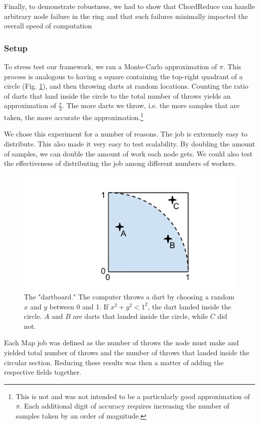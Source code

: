 Finally, to demonstrate robustness, we had to show that ChordReduce can handle arbitrary node failure in the ring and that such failures minimally impacted the overall speed of computation

\subsubsection{Setup}


To stress test our framework, we ran a Monte-Carlo approximation of $\pi$. 
This process is analogous to having a square containing  the top-right quadrant of a circle (Fig. \ref{fig:dartboard}), and then throwing darts at random locations.  
Counting the ratio of darts that land inside the circle to the total number of throws yields an approximation of $\frac{\pi}{4}$.  
The more darts we throw, i.e. the more samples that are taken, the more accurate the approximation.\footnote{This is not and was not intended to be a particularly good approximation of $\pi$.
Each additional digit of accuracy requires increasing the number of samples taken by an order of magnitude.}


We chose this experiment for a number of reasons. 
The job is extremely easy to distribute.  
This also made it very easy to test scalability. 
By doubling the amount of samples, we can double the amount of work each node gets.  
We could also test the effectiveness of distributing the job among different numbers of workers.


\begin{figure}
	\centering
	\includegraphics[width=0.5\linewidth]{figs/dartboard}
	\caption{The "dartboard." The computer throws a dart by choosing a random $x$ and $y$ between 0 and 1.  If $x^{2} + y^{2} < 1^{2} $, the dart landed inside the circle.  $A$ and $B$ are darts that landed inside the circle, while $C$ did not.}
	\label{fig:dartboard}
\end{figure}


Each Map job was defined as the number of throws the node must make and yielded total number of throws and the number of throws that landed inside the circular section.  
Reducing these results was then a matter of adding the respective fields together. 

